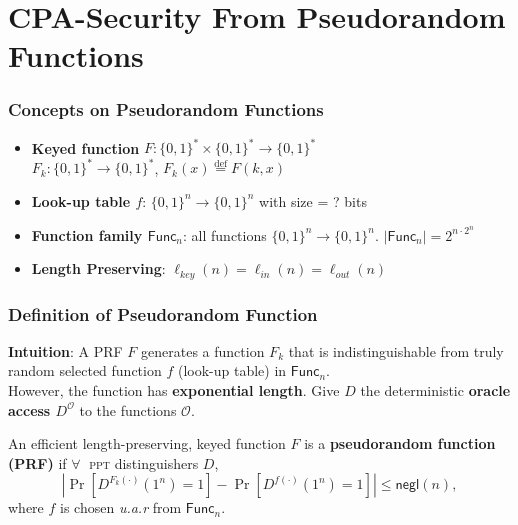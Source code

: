 \section{CPA-Security From Pseudorandom Functions}
\begin{frame}\frametitle{Concepts on Pseudorandom Functions}
\begin{figure}
\begin{center}

\end{center}
\end{figure}
\begin{itemize}
\item \textbf{Keyed function} $F : \{0,1\}^* \times \{0,1\}^* \to \{0,1\}^*$ \\
$F_k : \{0,1\}^* \to \{0,1\}^*$, $F_k(x) \overset{\text{def}}{=} F(k,x)$
\item \textbf{Look-up table $f$}: $\{0,1\}^n \to \{0,1\}^n$ with size \alert{ = ? bits} %
\item \textbf{Function family $\mathsf{Func}_n$}: all functions $\{0,1\}^n \to \{0,1\}^n$. $|\mathsf{Func}_n| = 2^{n\cdot2^n}$
\item \textbf{Length Preserving}: $\ell_{key}(n) = \ell_{in}(n) = \ell_{out}(n)$
\end{itemize}
\end{frame}
\begin{frame}\frametitle{Definition of Pseudorandom Function}
\textbf{Intuition}: A PRF $F$ generates a function $F_k$ that is indistinguishable from truly random selected function $f$ (look-up table) in $\mathsf{Func}_n$.\\ However, the function has \textbf{exponential length}. Give $D$ the deterministic \textbf{oracle access $D^{\mathcal{O}}$} to the functions $\mathcal{O}$.
\begin{definition}
An efficient length-preserving, keyed function $F$ is a \textbf{pseudorandom function (PRF)} if
$\forall\;$ \textsc{ppt} distinguishers $D$,
\[ \left|\Pr[D^{F_k(\cdot)}(1^n)=1] - \Pr[D^{f(\cdot)}(1^n)=1]\right| \le \mathsf{negl}(n),
\]
where $f$ is chosen \emph{u.a.r} from $\mathsf{Func}_n$.
\end{definition}
\end{frame}
